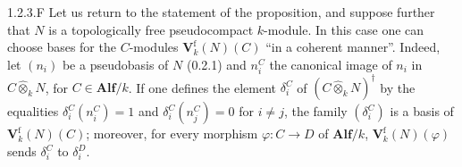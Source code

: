 \begin{remark}{1.2.3.F}\label{VIIB.1.2.3.F}
Let us return to the statement of the proposition, and suppose further that $N$ is a topologically free pseudocompact $k$-module. In this case one can choose bases for the $C$-modules $\mathbf V_k^{\mathrm f}(N)(C)$ ``in a coherent manner''.
Indeed, let $(n_i)$ be a pseudobasis of $N$ (0.2.1) and $n_i^C$ the canonical image of $n_i$ in $C\widehat\otimes_k N$, for $C\in\mathbf{Alf}/k$. If one defines the element $\delta_i^C$ of $(C\widehat\otimes_k N)^\dagger$ by the equalities $\delta_i^C(n_i^C)=1$ and $\delta_i^C(n_j^C)=0$ for $i\ne j$, the family $(\delta_i^C)$ is a basis of $\mathbf V_k^{\mathrm f}(N)(C)$; moreover, for every morphism $\varphi:C\to D$ of $\mathbf{Alf}/k$, $\mathbf V_k^{\mathrm f}(N)(\varphi)$ sends $\delta_i^C$ to $\delta_i^D$.
\end{remark}

